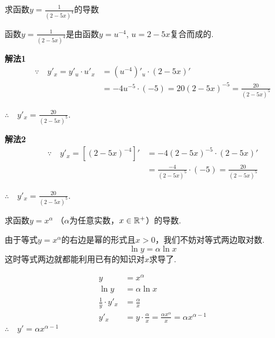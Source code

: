 \begin{example}
    求函数$y=\frac{1}{(2-5x)^4}$的导数
\end{example}

\begin{analyze}
    函数$y=\frac{1}{(2-5x)^4}$是由函数$y=u^{-4}$, $u=2-5x$复合而成的.
\end{analyze}

\begin{solution}
    \textbf{解法1} 
\[\begin{split}
    \because\quad y'_x=y'_u\cdot u'_x &=(u^{-4})'_u\cdot (2-5x)'\\
    &=-4u^{-5}\cdot (-5) =20(2-5x)^{-5}=\frac{20}{(2-5x)^5}
\end{split}\]

$\therefore\quad y'_x=\frac{20}{(2-5x)^5}$.

\textbf{解法2}
\[\begin{split}
    \because \quad y' _{x}=[(2-5x)^{-4}]' &=-4(2-5x)^{-5}\cdot (2-5x)' \\
    &=\frac{-4}{(2-5x)^5}\cdot (-5)=\frac{20}{(2-5x)^5}
\end{split}\]

$\therefore\quad y'_x=\frac{20}{(2-5x)^5}$.
\end{solution}

\begin{example}
求函数$y=x^{\alpha}$ （$\alpha$为任意实数，$x\in\mathbb{R}^+$）的导数.
\end{example}

\begin{analyze}
    由于等式$y=x^{\alpha}$的右边是幂的形式且$x>0$，我们不妨对等式两边取对数.
\[\ln y=\alpha\ln x\]
这时等式两边就都能利用已有的知识对$x$求导了.
\end{analyze}

\begin{solution}
\[\begin{split}
    y&=x^{\alpha}\\
    \ln y&=\alpha\ln x\\
\frac{1}{y}\cdot y'_x &=\frac{\alpha}{x}\\
y'_x&=y\cdot\frac{\alpha}{x}=\frac{\alpha x^{\alpha}}{x}=\alpha x^{\alpha-1}
\end{split}\]
$\therefore\quad y'=\alpha x^{\alpha-1}$
\end{solution}

